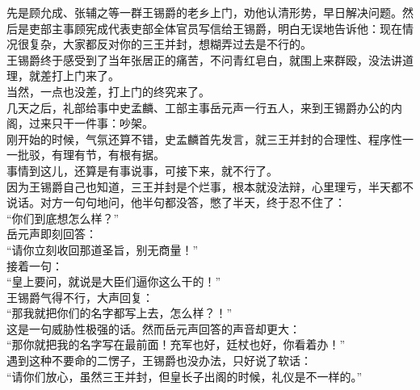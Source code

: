 \begin{multicols}{\theparacolNo}
先是顾允成、张辅之等一群王锡爵的老乡上门，劝他认清形势，早日解决问题。然后是吏部主事顾宪成代表吏部全体官员写信给王锡爵，明白无误地告诉他：现在情况很复杂，大家都反对你的三王并封，想糊弄过去是不行的。\\

王锡爵终于感受到了当年张居正的痛苦，不问青红皂白，就围上来群殴，没法讲道理，就差打上门来了。\\

当然，一点也没差，打上门的终究来了。\\

几天之后，礼部给事中史孟麟、工部主事岳元声一行五人，来到王锡爵办公的内阁，过来只干一件事：吵架。\\

刚开始的时候，气氛还算不错，史孟麟首先发言，就三王并封的合理性、程序性一一批驳，有理有节，有根有据。\\

事情到这儿，还算是有事说事，可接下来，就不行了。\\

因为王锡爵自己也知道，三王并封是个烂事，根本就没法辩，心里理亏，半天都不说话。对方一句句地问，他半句都没答，憋了半天，终于忍不住了：\\

“你们到底想怎么样？”\\

岳元声即刻回答：\\

“请你立刻收回那道圣旨，别无商量！”\\

接着一句：\\

“皇上要问，就说是大臣们逼你这么干的！”\\

王锡爵气得不行，大声回复：\\

“那我就把你们的名字都写上去，怎么样？！”\\

这是一句威胁性极强的话。然而岳元声回答的声音却更大：\\

“那你就把我的名字写在最前面！充军也好，廷杖也好，你看着办！”\\

遇到这种不要命的二愣子，王锡爵也没办法，只好说了软话：\\

“请你们放心，虽然三王并封，但皇长子出阁的时候，礼仪是不一样的。”\\


\end{multicols}
